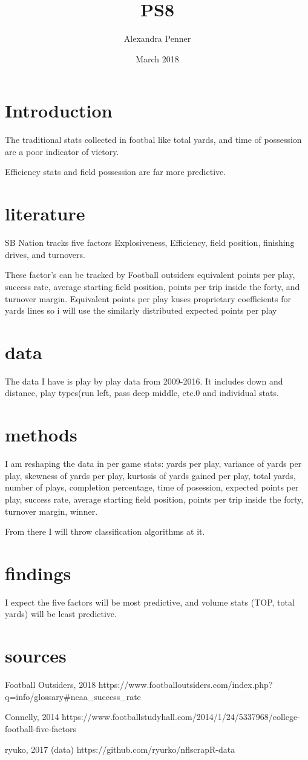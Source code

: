 \documentclass{article}
\title{PS8}
\author{Alexandra Penner}
\date{March 2018}
\begin{document}
\maketitle

\section{Introduction}
The traditional stats collected in footbal like total yards, and time of possession are a poor indicator of victory.

Efficiency stats and field possession are far more predictive.

\section{literature}
SB Nation tracks five factors Explosiveness, Efficiency, field position, finishing drives, and turnovers.

These factor's can be tracked by Football outsiders equivalent points per play, success rate, average starting field position, points per trip inside the forty, and turnover margin.  Equivalent points per play kuses proprietary coefficients for yards lines so i will use the similarly distributed expected points per play

\section{data}
The data I have is play by play data from 2009-2016.  It includes down and distance, play types(run left, pass deep middle, etc.0 and individual stats.

\section{methods}
I am reshaping the data in per game stats: yards per play, variance of yards per play, skewness of yards per play, kurtosis of yards gained per play, total yards, number of plays, completion percentage,  time of posession, expected points per play, success rate, average starting field position, points per trip inside the forty, turnover margin,  winner.

From there I will throw classification algorithms at it.

\section{findings}
I expect the five factors will be most predictive, and volume stats (TOP, total yards) will be least predictive.

\section{sources}
Football Outsiders, 2018
https://www.footballoutsiders.com/index.php?q=info/glossary#ncaa_success_rate

Connelly, 2014
https://www.footballstudyhall.com/2014/1/24/5337968/college-football-five-factors

ryuko, 2017 (data)
https://github.com/ryurko/nflscrapR-data
\end{document}
